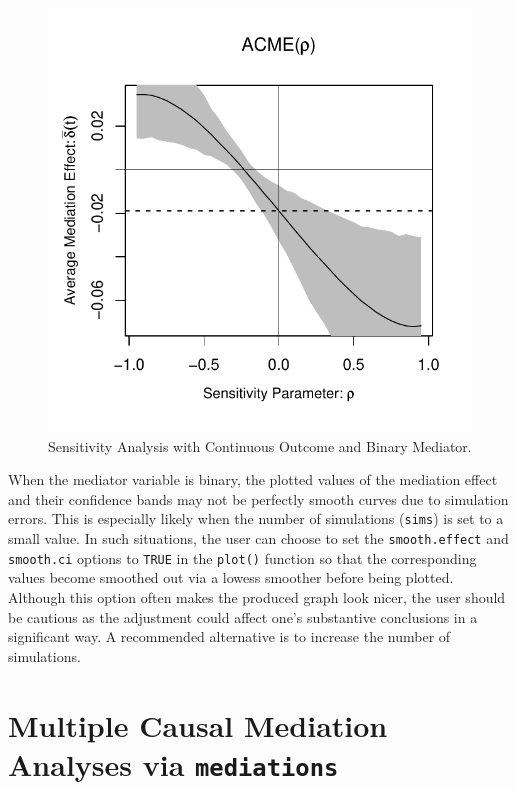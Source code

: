 \documentclass[11pt,letterpaper]{article}
\theoremstyle{plain}
\begin{document}
\begin{figure}[t]
\vspace{-.5in}
\begin{center}
\includegraphics[scale=.8]{BinaryMediator-Sensitivity-Rpaper.pdf}
\end{center}
\vspace{-.5in}
\caption{Sensitivity Analysis with Continuous Outcome and Binary Mediator.
  \label{SensBinMed}}
\end{figure}

When the mediator variable is binary, the plotted values of the mediation effect
and their confidence bands may not be perfectly smooth curves due to simulation errors.
This is especially likely when the number of simulations (\texttt{sims}) is set 
to a small value.  In such situations, the user can choose to set the 
\texttt{smooth.effect} and \texttt{smooth.ci} options to \texttt{TRUE} in the
\texttt{plot()} function so that the corresponding values become smoothed 
out via a lowess smoother before being plotted.  Although this option 
often makes the produced graph look nicer, the user should be cautious as 
the adjustment could affect one's substantive conclusions in a 
significant way.  A recommended alternative is to increase the number of 
simulations.

\section{Multiple Causal Mediation Analyses via {\tt mediations}}
\label{sec:mediations}
\end{document}
